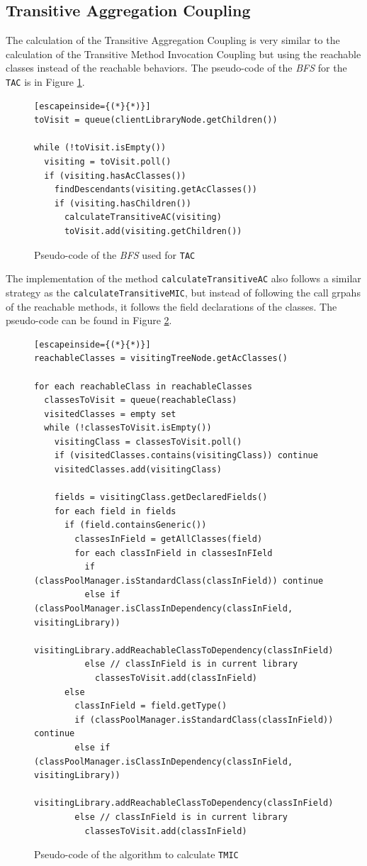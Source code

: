 \subsection{Transitive Aggregation Coupling}
The calculation of the Transitive Aggregation Coupling is very similar to the calculation of the Transitive Method Invocation Coupling but using the reachable classes instead of the reachable behaviors. The pseudo-code of the \textit{BFS} for the \texttt{TAC} is in Figure \ref{fig:tree-traversing-tac}.

\begin{figure}[ht!]
\begin{lstlisting}[escapeinside={(*}{*)}]
toVisit = queue(clientLibraryNode.getChildren())

while (!toVisit.isEmpty())
  visiting = toVisit.poll()
  if (visiting.hasAcClasses())
    findDescendants(visiting.getAcClasses())
    if (visiting.hasChildren())
      calculateTransitiveAC(visiting)
      toVisit.add(visiting.getChildren())
\end{lstlisting}
\caption{Pseudo-code of the \textit{BFS} used for \texttt{TAC}}
\label{fig:tree-traversing-tac}
\end{figure}

The implementation of the method \texttt{calculateTransitiveAC} also follows a similar strategy as the \texttt{calculateTransitiveMIC}, but instead of following the call grpahs of the reachable methods, it follows the field declarations of the classes. The pseudo-code can be found in Figure \ref{fig:calculate-tac}.

\begin{figure}[ht!]
\begin{lstlisting}[escapeinside={(*}{*)}]
reachableClasses = visitingTreeNode.getAcClasses()

for each reachableClass in reachableClasses
  classesToVisit = queue(reachableClass)
  visitedClasses = empty set
  while (!classesToVisit.isEmpty())
    visitingClass = classesToVisit.poll()
    if (visitedClasses.contains(visitingClass)) continue
    visitedClasses.add(visitingClass)

    fields = visitingClass.getDeclaredFields()
    for each field in fields
      if (field.containsGeneric())
        classesInField = getAllClasses(field)
        for each classInField in classesInFIeld
          if (classPoolManager.isStandardClass(classInField)) continue
          else if (classPoolManager.isClassInDependency(classInField, visitingLibrary))
            visitingLibrary.addReachableClassToDependency(classInField)
          else // classInField is in current library
            classesToVisit.add(classInField)
      else
        classInField = field.getType()
        if (classPoolManager.isStandardClass(classInField)) continue
        else if (classPoolManager.isClassInDependency(classInField, visitingLibrary))
          visitingLibrary.addReachableClassToDependency(classInField)
        else // classInField is in current library
          classesToVisit.add(classInField)
\end{lstlisting}
\caption{Pseudo-code of the algorithm to calculate \texttt{TMIC}}
\label{fig:calculate-tac}
\end{figure}

